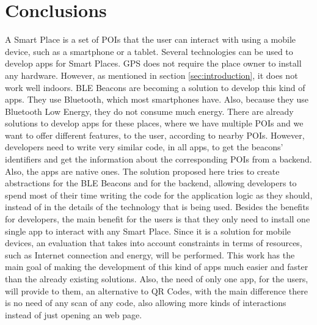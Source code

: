 
%
%

\section{Conclusions}
\label{sec:conclusions}
A Smart Place is a set of POIs that the user can interact
with using a mobile device, such as a smartphone or a tablet.
Several technologies can be used to develop apps for
Smart Places. GPS does not require the place owner to
install any hardware. However, as mentioned in 
section \ref{sec:introduction}, it does not work well
indoors. BLE Beacons are becoming a solution to
develop this kind of apps. They use Bluetooth,
which most smartphones have. Also, because they use
Bluetooth Low Energy, they do not consume much energy.
There are already solutions to develop apps for these
places, where we have multiple POIs and we want to
offer different features, to the user, according
to nearby POIs. However, developers need
to write very similar code, in all apps, to
get the beacons' identifiers and get the information
about the corresponding POIs from a backend.
Also, the apps are native ones.
The solution proposed here tries to create abstractions
for the BLE Beacons and for the backend, allowing
developers to spend most of their time writing the
code for the application logic as they should,
instead of in the details of the technology that is
being used. Besides the benefits for developers,
the main benefit for the users is that they only need
to install one single app to interact with any Smart Place.
Since it is a solution for mobile devices, an evaluation
that takes into account constraints in terms of resources,
such as Internet connection and energy, will be performed.
This work has the main goal of making the development
of this kind of apps much easier and faster than
the already existing solutions. Also, the need of only
one app, for the users, will provide to them, an alternative
to QR Codes, with the main difference there is no need of
any scan of any code, also allowing more kinds of interactions
instead of just opening an web page. 
